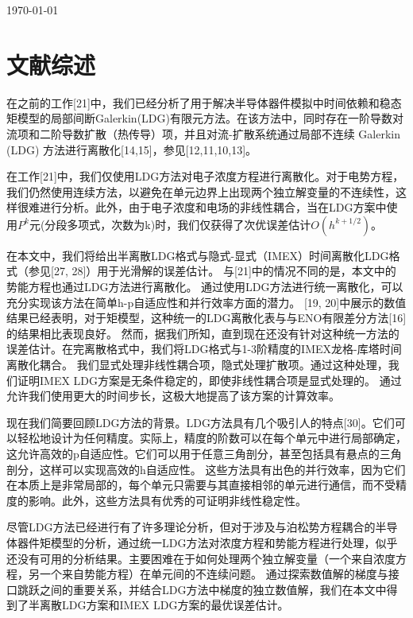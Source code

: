 \documentclass[lang=cn,newtx,10pt,scheme=chinese]{elegantbook}
\title{}
\begin{document}
\maketitle

\frontmatter

\tableofcontents

\mainmatter

\today
\chapter{文献综述}
在之前的工作[21]中，我们已经分析了用于解决半导体器件模拟中时间依赖和稳态矩模型的局部间断Galerkin(LDG)有限元方法。在该方法中，同时存在一阶导数对流项和二阶导数扩散（热传导）项，并且对流-扩散系统通过局部不连续 Galerkin (LDG) 方法进行离散化[14,15]，参见[12,11,10,13]。

在工作[21]中，我们仅使用LDG方法对电子浓度方程进行离散化。对于电势方程，我们仍然使用连续方法，以避免在单元边界上出现两个独立解变量的不连续性，这样很难进行分析。此外，由于电子浓度和电场的非线性耦合，当在LDG方案中使用$P^k$元(分段多项式，次数为k)时，我们仅获得了次优误差估计$O(h^{k+1/2})$。

在本文中，我们将给出半离散LDG格式与隐式-显式（IMEX）时间离散化LDG格式（参见[27, 28]）用于光滑解的误差估计。
与[21]中的情况不同的是，本文中的势能方程也通过LDG方法进行离散化。
通过使用LDG方法进行统一离散化，可以充分实现该方法在简单h-p自适应性和并行效率方面的潜力。
[19, 20]中展示的数值结果已经表明，对于矩模型，这种统一的LDG离散化表与与ENO有限差分方法[16]的结果相比表现良好。
然而，据我们所知，直到现在还没有针对这种统一方法的误差估计。在完离散格式中，我们将LDG格式与1-3阶精度的IMEX龙格-库塔时间离散化耦合。
我们显式处理非线性耦合项，隐式处理扩散项。通过这种处理，我们证明IMEX LDG方案是无条件稳定的，即使非线性耦合项是显式处理的。
通过允许我们使用更大的时间步长，这极大地提高了该方案的计算效率。

现在我们简要回顾LDG方法的背景。LDG方法具有几个吸引人的特点[30]。它们可以轻松地设计为任何精度。实际上，精度的阶数可以在每个单元中进行局部确定，这允许高效的p自适应性。它们可以用于任意三角剖分，甚至包括具有悬点的三角剖分，这样可以实现高效的h自适应性。
这些方法具有出色的并行效率，因为它们在本质上是非常局部的，每个单元只需要与其直接相邻的单元进行通信，而不受精度的影响。此外，这些方法具有优秀的可证明非线性稳定性。

尽管LDG方法已经进行有了许多理论分析，但对于涉及与泊松势方程耦合的半导体器件矩模型的分析，通过统一LDG方法对浓度方程和势能方程进行处理，似乎还没有可用的分析结果。主要困难在于如何处理两个独立解变量（一个来自浓度方程，另一个来自势能方程）在单元间的不连续问题。
通过探索数值解的梯度与接口跳跃之间的重要关系，并结合LDG方法中梯度的独立数值解，我们在本文中得到了半离散LDG方案和IMEX LDG方案的最优误差估计。
\end{document}
